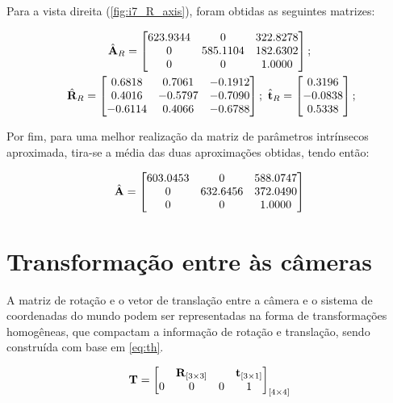 Para a vista direita (\autoref{fig:i7_R_axis}), foram obtidas as seguintes matrizes:

\begin{gather}\label{eq:vd}
	\hat{\mathbf{A}}_R = \begin{bmatrix}
	623.9344 & 0        & 322.8278 \\
	0        & 585.1104 & 182.6302 \\
	0        & 0        & 1.0000
	\end{bmatrix}; \\ \ \hat{\mathbf{R}}_R = \begin{bmatrix}
	0.6818  &  0.7061 &  -0.1912 \\
	0.4016  & -0.5797 &  -0.7090 \\
	-0.6114 &  0.4066 &  -0.6788
	\end{bmatrix}; \ \hat{\mathbf{t}}_R = \begin{bmatrix}
	 0.3196 \\
	-0.0838 \\
	 0.5338
	\end{bmatrix}; \label{eq:rtR}
\end{gather}

Por fim, para uma melhor realização da matriz de parâmetros intrínsecos aproximada, tira-se a média das duas aproximações obtidas, tendo então:

\begin{equation}\label{eq:amed}
	\hat{\mathbf{A}} = \begin{bmatrix}
		603.0453 & 0        & 588.0747 \\
		0        & 632.6456 & 372.0490 \\
		0        & 0        & 1.0000
		
	\end{bmatrix}
\end{equation}



\section{Transformação entre às câmeras}

A matriz de rotação e o vetor de translação entre a câmera e o sistema de coordenadas do mundo podem ser representadas na forma de transformações homogêneas, que compactam a informação de rotação e translação, sendo construída com base em \eqref{eq:th}.

\begin{equation}
	\mathbf{T} = \begin{bmatrix}
	&	\mathbf{R}_{[3\times 3]} & & \mathbf{t}_{[3\times 1]} \\
		0 & 0 & 0 & 1
	\end{bmatrix}_{[4\times 4]}
	\label{eq:th}
\end{equation}

